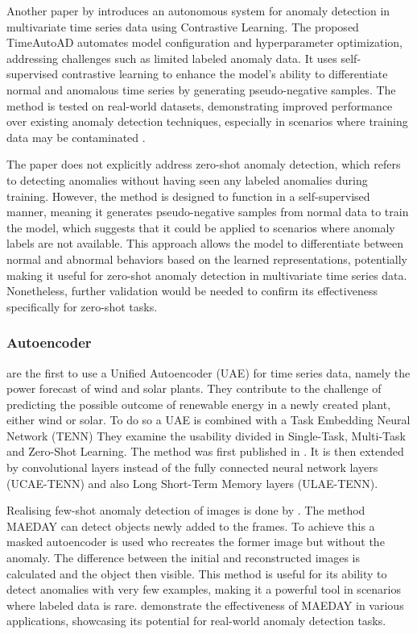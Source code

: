 Another paper by  introduces an autonomous system for anomaly detection in multivariate time series data using Contrastive Learning. The proposed TimeAutoAD automates model configuration and hyperparameter optimization, addressing challenges such as limited labeled anomaly data. It uses self-supervised contrastive learning to enhance the model's ability to differentiate normal and anomalous time series by generating pseudo-negative samples. The method is tested on real-world datasets, demonstrating improved performance over existing anomaly detection techniques, especially in scenarios where training data may be contaminated \cite{jiao_timeautoad_2022}.

The paper does not explicitly address zero-shot anomaly detection, which refers to detecting anomalies without having seen any labeled anomalies during training. However, the method is designed to function in a self-supervised manner, meaning it generates pseudo-negative samples from normal data to train the model, which suggests that it could be applied to scenarios where anomaly labels are not available. This approach allows the model to differentiate between normal and abnormal behaviors based on the learned representations, potentially making it useful for zero-shot anomaly detection in multivariate time series data. Nonetheless, further validation would be needed to confirm its effectiveness specifically for zero-shot tasks.
\subsubsection{Autoencoder}
 are the first to use a Unified Autoencoder (UAE) for time series data, namely the power forecast of wind and solar plants. They contribute to the challenge of predicting the possible outcome of renewable energy in a newly created plant, either wind or solar. To do so a UAE is combined with a Task Embedding Neural Network (TENN) They examine the usability divided in Single-Task, Multi-Task and Zero-Shot Learning. The method was first published in . It is then extended by convolutional layers instead of the fully connected neural network layers (UCAE-TENN) and also Long Short-Term Memory layers (ULAE-TENN).

Realising few-shot anomaly detection of images is done by . The method MAEDAY can detect objects newly added to the frames. To achieve this a masked autoencoder is used who recreates the former image but without the anomaly. The difference between the initial and reconstructed images is calculated and the object then visible.
This method is useful for its ability to detect anomalies with very few examples, making it a powerful tool in scenarios where labeled data is rare.  demonstrate the effectiveness of MAEDAY in various applications, showcasing its potential for real-world anomaly detection tasks.

